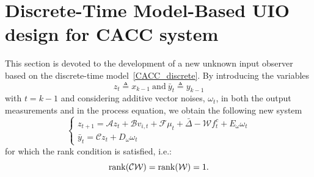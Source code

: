 {\section{Discrete-Time Model-Based UIO design for CACC system}\label{sec3}
This section is devoted to the development of a new unknown input observer based on the discrete-time model~\eqref{CACC_discrete}. By introducing the variables
\begin{equation}\label{ali_e6}
z_t \triangleq x_{k-1}~\text{and}~\bar{y}_{t} \triangleq y_{k-1}
\end{equation}
with $t = k-1$ and considering additive vector noises, $\omega_{t}$, in both the output measurements and in the process equation, we obtain the following new system
\begin{equation}\label{CACC_discrete_delay}
      \left\{ \begin{array}{l}
        z_{t+1} = \mathcal{A} z_{t}+\mathcal{B}  v_{i,t} + \mathcal{F}  \mu_{t} + \bar{\Delta} - \mathcal{W}  f^c_{t} + E_{\omega} \omega_{t}\\
        \bar{y}_{t} = \mathcal{C} z_{t} + D_{\omega} \omega_{t} \end{array}\right.
\end{equation}
for which the rank condition is satisfied, i.e.: 
\begin{equation}\label{ali_rank}
\mathop{{\rm rank}}(\mathcal{C} \mathcal{W}) = \mathop{{\rm rank}}(\mathcal{W}) = 1.
\end{equation}


}
